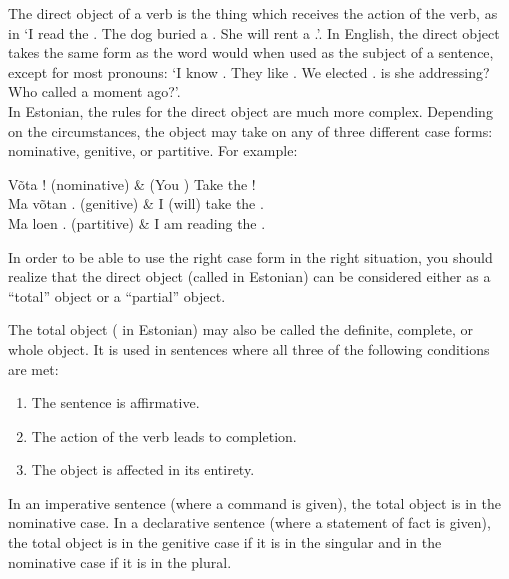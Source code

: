 \newLesson %

\Grammar %


\newSection The direct object of a verb is the thing which receives the action of the verb, as in `I read the . The dog buried a . She will rent a .'. In English, the direct object takes the same form as the word would when used as the subject of a sentence, except for most pronouns: `I know . They like . We elected .  is she addressing? Who called  a moment ago?'. \\

In Estonian, the rules for the direct object are much more complex. Depending on the circumstances, the object may take on any of three different case forms: nominative, genitive, or partitive. For example:

	\twoColumnsTable
	Võta ! \small{(nominative)} 		& (You \sing) Take the ! \\
	Ma võtan . \small{(genitive)}  	&	I (will) take the . \\
	Ma loen . \small{(partitive)} 	&	I am reading the .
	\tableEnd

In order to be able to use the right case form in the right situation, you should realize that the direct object (called  in Estonian) can be considered either as a ``total'' object or a ``partial'' object.


\newSection The total object ( in Estonian) may also be called the definite, complete, or whole object. It is used in sentences where all three of the following conditions are met:

	\begin{enumerate}
	\item The sentence is affirmative.
	\item The action of the verb leads to completion.
	\item The object is affected in its entirety.
	\end{enumerate}

\newSection In an imperative sentence (where a command is given), the total object is in the nominative case. In a declarative sentence (where a statement of fact is given), the total object is in the genitive case if it is in the singular and in the nominative case if it is in the plural.

